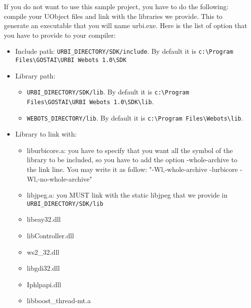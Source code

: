 If you do not want to use this sample project, you have to do the
following: compile your UObject files and link with the libraries we
provide. This to generate an executable that you will name urbi.exe.
Here is the list of option that you have to provide to your compiler:
 \begin{itemize}

\item{}         Include path: \nolinkurl{URBI_DIRECTORY/SDK/include}. By default it is
 \nolinkurl{c:\Program Files\GOSTAI\URBI Webots 1.0\SDK}


\item{}         Library path:
 \begin{itemize}

\item{}  \nolinkurl{URBI_DIRECTORY/SDK/lib}. By default it is
 \nolinkurl{c:\Program Files\GOSTAI\URBI Webots 1.0\SDK\lib}.



\item{}  \nolinkurl{WEBOTS_DIRECTORY/lib}. By default it is
 \nolinkurl{c:\Program Files\Webots\lib}.


\end{itemize}



\item{}         Library to link with:
 \begin{itemize}

 \item{} liburbicore.a: you have to specify that you want all the
   symbol of the library to be included, so you have to add the option
   -{}whole-{}archive to the link line. You may write it as follow:
   "-{}Wl,-{}whole-{}archive -{}lurbicore
   -{}Wl,-{}no-{}whole-{}archive"



\item{}               libjpeg.a: you MUST link with the static libjpeg that we provide in
 \nolinkurl{URBI_DIRECTORY/SDK/lib}


\item{}               libeay32.dll



\item{}               libController.dll



\item{}               ws2\_32.dll



\item{}               libgdi32.dll



\item{}               Iphlpapi.dll



\item{}             libboost\_thread-{}mt.a


\end{itemize}


\end{itemize}
